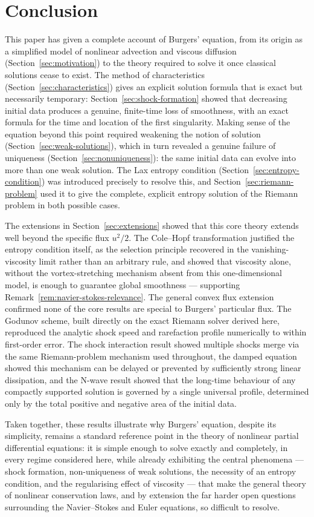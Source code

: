\section{Conclusion}
\label{sec:conclusion}

This paper has given a complete account of Burgers' equation, from its
origin as a simplified model of nonlinear advection and viscous diffusion
(Section~\ref{sec:motivation}) to the theory required to solve it once
classical solutions cease to exist. The method of characteristics
(Section~\ref{sec:characteristics}) gives an explicit solution formula
that is exact but necessarily temporary: Section~\ref{sec:shock-formation}
showed that decreasing initial data produces a genuine, finite-time loss
of smoothness, with an exact formula for the time and location of the
first singularity. Making sense of the equation beyond this point
required weakening the notion of solution
(Section~\ref{sec:weak-solutions}), which in turn revealed a genuine
failure of uniqueness (Section~\ref{sec:nonuniqueness}): the same initial
data can evolve into more than one weak solution. The Lax entropy
condition (Section~\ref{sec:entropy-condition}) was introduced precisely
to resolve this, and Section~\ref{sec:riemann-problem} used it to give
the complete, explicit entropy solution of the Riemann problem in both
possible cases.

The extensions in Section~\ref{sec:extensions} showed that this core
theory extends well beyond the specific flux $u^2/2$. The Cole--Hopf
transformation justified the entropy condition itself, as the selection
principle recovered in the vanishing-viscosity limit rather than an
arbitrary rule, and showed that viscosity alone, without the
vortex-stretching mechanism absent from this one-dimensional model, is
enough to guarantee global smoothness ---
supporting Remark~\ref{rem:navier-stokes-relevance}. The general convex
flux extension confirmed none of the core results are special to
Burgers' particular flux. The Godunov scheme, built directly on the
exact Riemann solver derived here, reproduced the analytic shock speed
and rarefaction profile numerically to within first-order error. The
shock interaction result showed multiple shocks merge via the same
Riemann-problem mechanism used throughout, the damped equation showed
this mechanism can be delayed or prevented by sufficiently strong linear
dissipation, and the N-wave result showed that the long-time behaviour of
any compactly supported solution is governed by a single universal
profile, determined only by the total positive and negative area of the
initial data.

Taken together, these results illustrate why Burgers' equation, despite
its simplicity, remains a standard reference point in the theory of
nonlinear partial differential equations: it is simple enough to solve
exactly and completely, in every regime considered here, while already
exhibiting the central phenomena --- shock formation, non-uniqueness of
weak solutions, the necessity of an entropy condition, and the
regularising effect of viscosity --- that make the general theory of
nonlinear conservation laws, and by extension the far harder open
questions surrounding the Navier--Stokes and Euler equations, so
difficult to resolve.